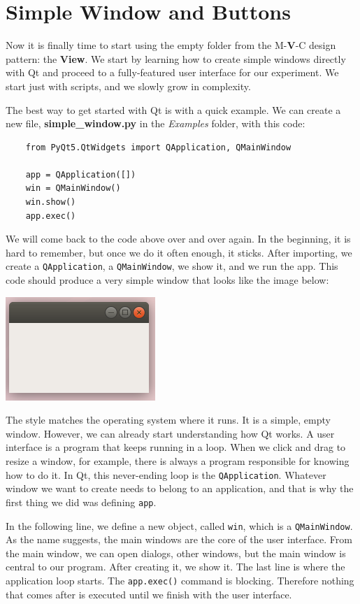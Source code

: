 \section{Simple Window and Buttons}\label{sec:simple-window-andbuttons}
Now it is finally time to start using the empty folder from the M-\textbf{V}-C design pattern: the \textbf{View}. We start by learning how to create simple windows directly with Qt and proceed to a fully-featured user interface for our experiment. We start just with scripts, and we slowly grow in complexity.

The best way to get started with Qt is with a quick example. We can create a new file, \textbf{simple\_window.py} in the \emph{Examples} folder, with this code:

\begin{verbatim}
    from PyQt5.QtWidgets import QApplication, QMainWindow

    app = QApplication([])
    win = QMainWindow()
    win.show()
    app.exec()
\end{verbatim}

We will come back to the code above over and over again. In the beginning, it is hard to remember, but once we do it often enough, it sticks. After importing, we create a \texttt{QApplication}, a \texttt{QMainWindow}, we show it, and we run the app. This code should produce a very simple window that looks like the image below:

\begin{center}
    \includegraphics[width=.3\textwidth]{images/Chapter_08/01_simple_window.png}
\end{center}

The style matches the operating system where it runs. It is a simple, empty window. However, we can already start understanding how Qt works. A user interface is a program that keeps running in a loop. When we click and drag to resize a window, for example, there is always a program responsible for knowing how to do it. In Qt, this never-ending loop is the \texttt{QApplication}. Whatever window we want to create needs to belong to an application, and that is why the first thing we did was defining \texttt{app}.

In the following line, we define a new object, called \texttt{win}, which is a \texttt{QMainWindow}. As the name suggests, the main windows are the core of the user interface. From the main window, we can open dialogs, other windows, but the main window is central to our program. After creating it, we show it. The last line is where the application loop starts. The \texttt{app.exec()} command is blocking. Therefore nothing that comes after is executed until we finish with the user interface.

